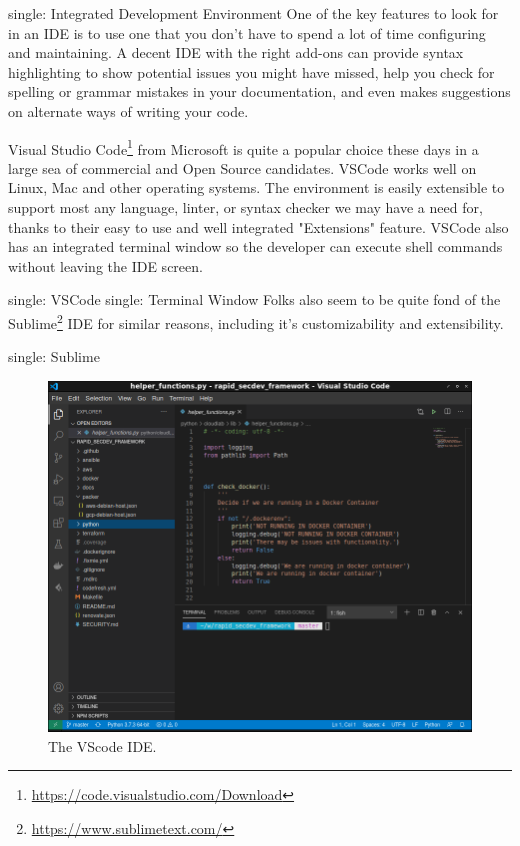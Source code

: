 single: Integrated Development Environment
\justify
One of the key features to look for in an IDE is to use one that you
don't have to spend a lot of time configuring and maintaining. A decent
IDE with the right add-ons can provide syntax highlighting to show
potential issues you might have missed, help you check for spelling or
grammar mistakes in your documentation, and even makes suggestions on
alternate ways of writing your code.

\justify
Visual Studio Code\footnote{\url{https://code.visualstudio.com/Download}}
from Microsoft is quite a popular choice these days in a large sea of
commercial and Open Source candidates. VSCode works well on Linux, Mac
and other operating systems. The environment is easily extensible to
support most any language, linter, or syntax checker we may have a need
for, thanks to their easy to use and well integrated "Extensions"
feature. VSCode also has an integrated terminal window so the developer
can execute shell commands without leaving the IDE screen.

single: VSCode single: Terminal Window
\justify
Folks also seem to be quite fond of the Sublime\footnote{\url{https://www.sublimetext.com/}} IDE for similar reasons, including it's customizability and extensibility.

single: Sublime

\begin{figure}
\centering
\includegraphics{../images/setup-vscode.png}
\caption{The VScode IDE.}
\end{figure}

